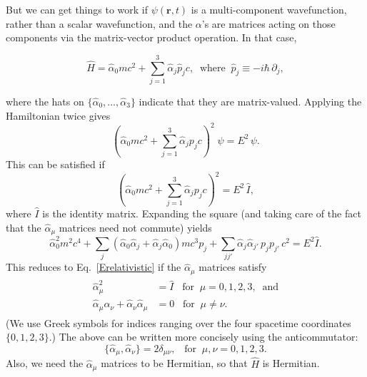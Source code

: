 \documentclass[pra,12pt]{revtex4}
\begin{document}
But we can get things to work if $\psi(\mathbf{r},t)$ is a
multi-component wavefunction, rather than a scalar wavefunction, and
the $\alpha$'s are matrices acting on those components via the
matrix-vector product operation.  In that case,
\begin{framed}
  \begin{equation}
    \hat{H} = \hat{\alpha}_0 mc^2 + \sum_{j=1}^3 \hat{\alpha}_j \hat{p}_j c,
    \;\; \mathrm{where}\;\; \hat{p}_j \equiv -i\hbar\, \partial_j,
    \label{Dirac}
  \end{equation}
\end{framed}
\vskip -0.15in
\noindent
where the hats on $\{\hat{\alpha}_0, \dots, \hat{\alpha}_3\}$ indicate
that they are matrix-valued.  Applying the Hamiltonian twice gives
\begin{equation}
  \left(\hat{\alpha}_0mc^2 + \sum_{j=1}^3\hat{\alpha}_j p_j c\right)^{\!2}\;
  \psi = E^2\,\psi.
\end{equation}
This can be satisfied if
\begin{equation}
  \left(\hat{\alpha}_0 mc^2 + \sum_{j=1}^3\hat{\alpha}_j p_j c\right)^2
  = E^2\, \hat{I},
\end{equation}
where $\hat{I}$ is the identity matrix.  Expanding the square (and
taking care of the fact that the $\hat{\alpha}_\mu$ matrices need not
commute) yields
\begin{equation}
  \hat{\alpha}_0^2 m^2c^4
  + \sum_j \left(\hat{\alpha}_0 \hat{\alpha}_j + \hat{\alpha}_j \hat{\alpha}_0\right) mc^3 p_j
  + \sum_{jj'} \hat{\alpha}_j \hat{\alpha}_{j'} \, p_j p_{j'} \,c^2 = E^2\hat{I}.
\end{equation}
This reduces to Eq.~\eqref{Erelativistic} if the $\hat{\alpha}_\mu$
matrices satisfy
\begin{align}
  \begin{aligned}
    \hat{\alpha}_\mu^2 &= \hat{I} \;\;\; \textrm{for} \;\;\mu=0,1,2,3,
    \;\;\textrm{and} \\
    \hat{\alpha}_\mu \hat{\alpha}_\nu
    + \hat{\alpha}_\nu \hat{\alpha}_\mu &= 0
    \;\;\; \textrm{for} \;\;\mu \ne \nu.
  \end{aligned}
\end{align}
(We use Greek symbols for indices ranging over the four spacetime
coordinates $\{0,1,2,3\}$.)  The above can be written more concisely
using the anticommutator:
\begin{equation}
  \{\hat{\alpha}_\mu, \hat{\alpha}_\nu\} = 2\delta_{\mu\nu},
  \;\;\; \textrm{for} \;\;\mu,\nu=0,1,2,3.
  \label{Dirac_anticomm}
\end{equation}
Also, we need the $\hat{\alpha}_\mu$ matrices to be Hermitian, so that
$\hat{H}$ is Hermitian.
\end{document}
